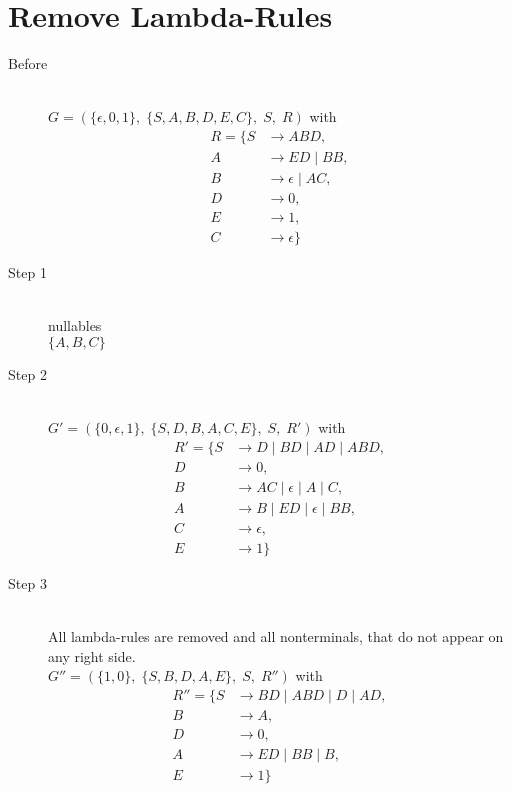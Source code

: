 \documentclass{article}
\begin{document}
\section{Remove Lambda-Rules}

\begin{description}
	\item[Before] \hfill \\ 
		$G=\left(\{	\epsilon, 0, 1\},\;\{ S, A, B, D, E, C\},\;S,\;R\right)$ with
	\begin{align*}
		R=\{	S &\rightarrow ABD, \\ 
		A &\rightarrow ED\;|\;BB, \\ 
		B &\rightarrow \epsilon\;|\;AC, \\ 
		D &\rightarrow 0, \\ 
		E &\rightarrow 1, \\ 
		C &\rightarrow \epsilon\}
	\end{align*}
	\item[Step 1] \hfill \\ 
	nullables\\ 
	$\{	A, 	B, 	C\}$
	\item[Step 2] \hfill \\ 
		$G'=\left(\{	0, \epsilon, 1\},\;\{ S, D, B, A, C, E\},\;S,\;R'\right)$ with
	\begin{align*}
		R'=\{	S &\rightarrow D\;|\;BD\;|\;AD\;|\;ABD, \\ 
		D &\rightarrow 0, \\ 
		B &\rightarrow AC\;|\;\epsilon\;|\;A\;|\;C, \\ 
		A &\rightarrow B\;|\;ED\;|\;\epsilon\;|\;BB, \\ 
		C &\rightarrow \epsilon, \\ 
		E &\rightarrow 1\}
	\end{align*}
	\item[Step 3] \hfill \\ 
	All lambda-rules are removed and all nonterminals, that do not appear on any right side.\\ 
	$G''=\left(\{	1, 0\},\;\{ S, B, D, A, E\},\;S,\;R''\right)$ with
	\begin{align*}
		R''=\{	S &\rightarrow BD\;|\;ABD\;|\;D\;|\;AD, \\ 
		B &\rightarrow A, \\ 
		D &\rightarrow 0, \\ 
		A &\rightarrow ED\;|\;BB\;|\;B, \\ 
		E &\rightarrow 1\}
	\end{align*}
\end{description}
\end{document}
